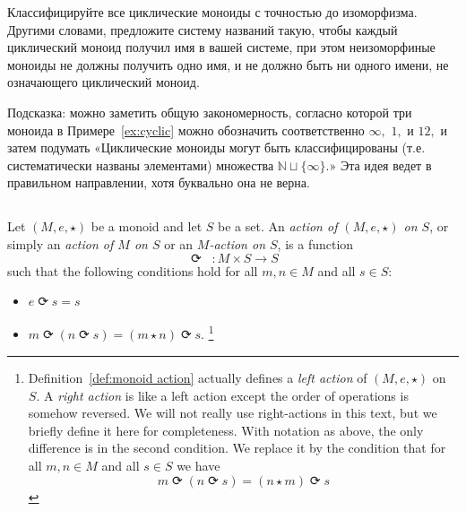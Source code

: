 \documentclass[../main/CT4S-EN-RU]{subfiles}
\begin{document}
\begin{exerciseRUS}\label{exc:classify cyclic}
Классифицируйте все циклические моноиды с точностью до изоморфизма. Другими словами, предложите систему названий такую, чтобы каждый циклический моноид получил имя в вашей системе, при этом неизоморфиные моноиды не должны получить одно имя, и не должно быть ни одного имени, не означающего циклический моноид.

Подсказка: можно заметить общую закономерность, согласно которой три моноида в Примере~\ref{ex:cyclic} можно обозначить соответственно $\infty,$ $1,$ и $12,$ и затем подумать «Циклические моноиды могут быть классифицированы (т.е. систематически названы элементами) множества ${ℕ}\sqcup\{\infty\}.$» Эта идея ведет в правильном направлении, хотя буквально она не верна.
\end{exerciseRUS}


\subsection{}

\begin{definitionENG}\label{def:monoid action}
Let $(M,e,{⋆})$ be a monoid and let $S$ be a set. An {\em action of $(M,e,{⋆})$ on $S$}, or simply an {\em action of $M$ on $S$} or an {\em $M$-action on $S$}, is a function $${⟳}\;\;\colon M\times S{→} S$$ such that the following conditions hold for all $m,n\in M$ and all $s\in S$:
\begin{itemize}
\item $e{⟳} s=s$
\item $m{⟳}(n{⟳} s)=(m{⋆} n){⟳} s.$%
\footnote{Definition~\ref{def:monoid action} actually defines a {\em left action} of $(M,e,{⋆})$ on $S.$ A {\em right action} is like a left action except the order of operations is somehow reversed. We will not really use right-actions in this text, but we briefly define it here for completeness. With notation as above, the only difference is in the second condition. We replace it by the condition that for all $m,n\in M$ and all $s\in S$ we have
$$m{⟳}(n{⟳} s)=(n{⋆} m){⟳} s$$}
\end{itemize}
\end{definitionENG}
\end{document}
